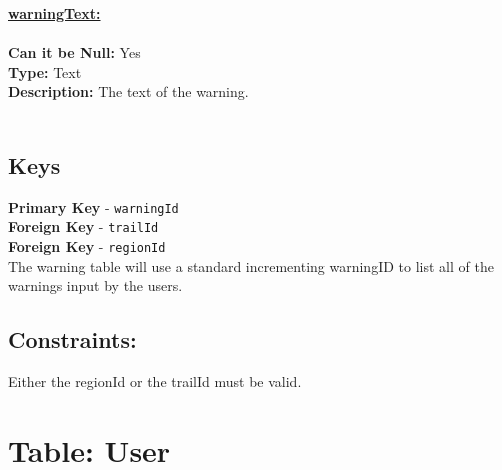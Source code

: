 \textbf{\underline{warningText:}}\\
\\
\textbf{Can it be Null:} Yes\\
\textbf{Type:} Text\\ %
\textbf{Description:}
The text of the warning. \\\\


\subsection{Keys}
\textbf{Primary Key} - \texttt{warningId}\\
\textbf{Foreign Key} - \texttt{trailId}\\
\textbf{Foreign Key} - \texttt{regionId}\\
The warning table will use a standard incrementing warningID to 
list all of the warnings input by the users.
\subsection{Constraints:}
Either the regionId or the trailId must be valid. 

\newpage



\newpage
\section{Table: User}
